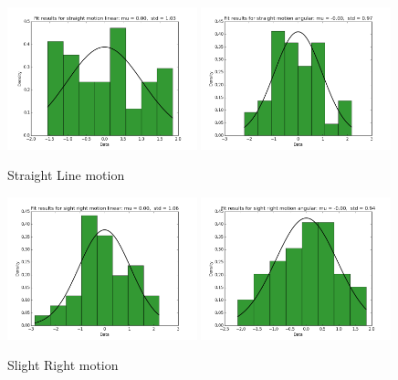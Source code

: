 \documentclass[10pt]{scrartcl}
\begin{document}
\begin{figure}[H]
\centering
\caption{Straight Line motion}
\label{fig:11}
\includegraphics[width=0.49\textwidth ]{images/pca_straight_linear_data}
\includegraphics[width=0.49\textwidth]{images/pca_straight_angular_data}
\end{figure}

\begin{figure}[H]
\centering
\caption{Slight Right motion}
\label{fig:12}
\includegraphics[width=0.49\textwidth ]{images/pca_slight_right_linear_data}
\includegraphics[width=0.49\textwidth]{images/pca_slight_right_angular_data}
\end{figure}
\end{document}
